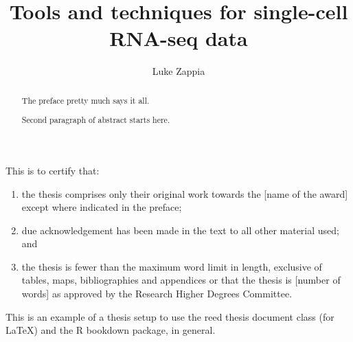 \documentclass[11pt,a4paper,titlepage,twoside,openright]{style/unimelbthesis}
\title{Tools and techniques for single-cell RNA-seq data}
\author{Luke Zappia}
\theoremstyle{definition}
\theoremstyle{definition}
\theoremstyle{definition}
\theoremstyle{remark}
\begin{document}
\begin{frontmatter}


  \maketitle


  \begin{abstract}
    The preface pretty much says it all.
    
    \par
    
    Second paragraph of abstract starts here.
  \end{abstract}


  \begin{declaration}
    This is to certify that:
    
    \begin{enumerate}
    \def\labelenumi{\roman{enumi}.}
    \tightlist
    \item
      the thesis comprises only their original work towards the {[}name of the award{]} except where indicated in the preface;
    \item
      due acknowledgement has been made in the text to all other material used; and
    \item
      the thesis is fewer than the maximum word limit in length, exclusive of tables, maps, bibliographies and appendices or that the thesis is {[}number of words{]} as approved by the Research Higher Degrees Committee.
    \end{enumerate}
  \end{declaration}


  \begin{preface}
    This is an example of a thesis setup to use the reed thesis document class (for LaTeX) and the R bookdown package, in general.
  \end{preface}



\end{frontmatter}
\end{document}

